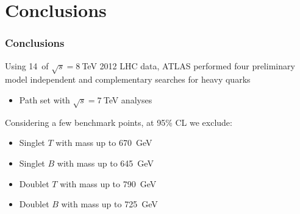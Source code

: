 \documentclass[xcolor=dvipsnames,10pt]{beamer}
\begin{document}
\section{Conclusions}
\begin{frame}\frametitle{Conclusions}
\scriptsize\centering

\begin{minipage}{.32\textwidth}
\centering

Using 14\ifb\ of $\sqrt{s}=8~$TeV 2012 LHC data, ATLAS performed four preliminary \alert{model independent} and \alert{complementary} searches for heavy quarks
\begin{itemize}
\item Path set with $\sqrt{s}=7~$TeV analyses
\end{itemize}


Considering a few benchmark points, at 95\% CL we exclude:
\begin{itemize}
\item Singlet $T$ with mass up to 670~GeV~\cite{ATLAS-CONF-2013-018,ATLAS-CONF-2013-060}
\item Singlet $B$ with mass up to 645~GeV~\cite{ATLAS-CONF-2013-056}
\item Doublet $T$ with mass up to 790~GeV~\cite{ATLAS-CONF-2013-018}
\item Doublet $B$ with mass up to 725~GeV~\cite{ATLAS-CONF-2013-056}
\end{itemize}



\end{minipage}
\end{frame}
\end{document}
